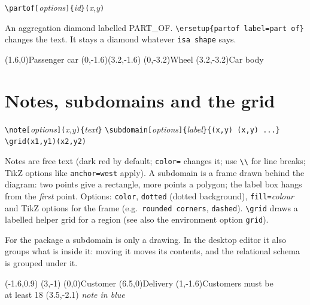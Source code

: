 \documentclass[10pt,a4paper]{article}
\newcommand\cs[1]{\texttt{\textbackslash#1}}
\newcommand\meta[1]{\textlangle\textit{#1}\textrangle}
\begin{document}
\begin{center}
\verb|\partof[|\meta{options}\verb|]{|\meta{id}\verb|}(|\meta{x,y}\verb|)|
\end{center}

An aggregation diamond labelled PART\_OF. \verb|\ersetup{partof label=part of}| changes the
text. It stays a diamond whatever \texttt{isa shape} says.

\begin{example}
\begin{erdiagram}
  (1.6,0){Passenger car}
  (0,-1.6)(3.2,-1.6)
  (0,-3.2){Wheel}
  (3.2,-3.2){Car body}
\end{erdiagram}
\end{example}

\section{Notes, subdomains and the grid}

\begin{center}
\verb|\note[|\meta{options}\verb|](|\meta{x,y}\verb|){|\meta{text}\verb|}|\qquad
\verb|\subdomain[|\meta{options}\verb|]{|\meta{label}\verb|}{(x,y) (x,y) ...}|\qquad
\verb|\grid(x1,y1)(x2,y2)|
\end{center}

Notes are free text (dark red by default; \texttt{color=} changes it; use
\verb|\\| for line breaks; TikZ options like \texttt{anchor=west} apply).
A subdomain is a frame drawn behind the diagram: two points give a
rectangle, more points a polygon; the label box hangs from the
\emph{first} point. Options: \texttt{color}, \texttt{dotted} (dotted
background), \texttt{fill=}\meta{colour} and TikZ options for the frame
(e.g.\ \texttt{rounded corners}, \texttt{dashed}). \cs{grid} draws a
labelled helper grid for a region (see also the environment option
\texttt{grid}).

For the package a subdomain is only a drawing. In the desktop editor it also groups
what is inside it: moving it moves its contents, and the relational schema is grouped under it.

\begin{example}
\begin{erdiagram}[max width=\linewidth]
    {(-1.6,0.9) (3,-1)}
  (0,0){Customer}
  (6.5,0){Delivery}
  \note(1,-1.6){Customers must be\\at least 18}
  \note[color=blue, anchor=west](3.5,-2.1)
    {\textit{note in blue}}
\end{erdiagram}
\end{example}
\end{document}
